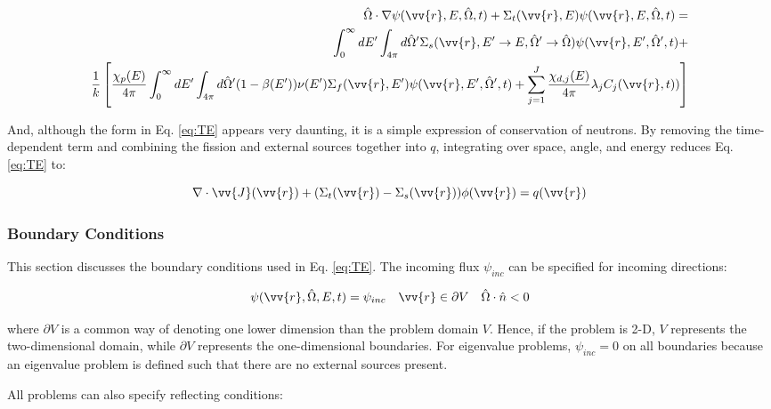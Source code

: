 \documentclass[10pt]{article}
\begin{document}
\begin{flushleft}
\begin{equation}
\label{eq:TE_eigenvalue}
\begin{aligned}
 \hat{\Omega}\cdot\nabla\psi(\vv{r}, E, \hat{\Omega},t) + 
 \Sigma_t(\vv{r},E)\psi(\vv{r}, E, \hat{\Omega},t) = \\
\int_{0}^{\infty}dE' \int_{4\pi}^{ } d\hat{\Omega}' \Sigma_s(\vv{r}, E'\rightarrow E, \hat{\Omega}'\rightarrow\hat{\Omega})\psi(\vv{r}, E', \hat{\Omega}',t) + \\
 \frac{1}{k}\left\lbrack\frac{\chi_p(E)}{4\pi} \int_{0}^{\infty} dE'\int_{4\pi}^{} d\hat{\Omega}'(1-\beta(E'))\nu(E')\Sigma_f(\vv{r}, E')\psi(\vv{r}, E', \hat{\Omega}',t) + 
 \sum_{j = 1}^{J} \frac{\chi_{d,j}(E)}{4\pi} \lambda_j C_j(\vv{r}, t))\right\rbrack
\end{aligned}
\end{equation}

And, although the form in Eq. \eqref{eq:TE} appears very daunting, it is a simple expression of conservation of neutrons. By removing the time-dependent term and combining the fission and external sources together into \(q\), integrating over space, angle, and energy reduces Eq. \eqref{eq:TE} to:

\begin{equation}
\nabla\cdot\vv{J}(\vv{r})+(\Sigma_t(\vv{r})-\Sigma_s(\vv{r}))\phi(\vv{r})=q(\vv{r})
\end{equation}

\subsubsection{Boundary Conditions}

This section discusses the boundary conditions used in Eq. \eqref{eq:TE}. The incoming flux \(\psi_{inc}\) can be specified for incoming directions:

\begin{equation}
\psi(\vv{r},\hat{\Omega},E,t)=\psi_{inc}\quad\vv{r}\in \partial V\quad\hat{\Omega}\cdot\hat{n}<0
\end{equation}

where \(\partial V\) is a common way of denoting one lower dimension than the problem domain \(V\). Hence, if the problem is 2-D, \(V\) represents the two-dimensional domain, while \(\partial V\) represents the one-dimensional boundaries. For eigenvalue problems, \(\psi_{inc}=0\) on all boundaries because an eigenvalue problem is defined such that there are no external sources present. 

All problems can also specify reflecting conditions:


\end{flushleft}
\end{document}

